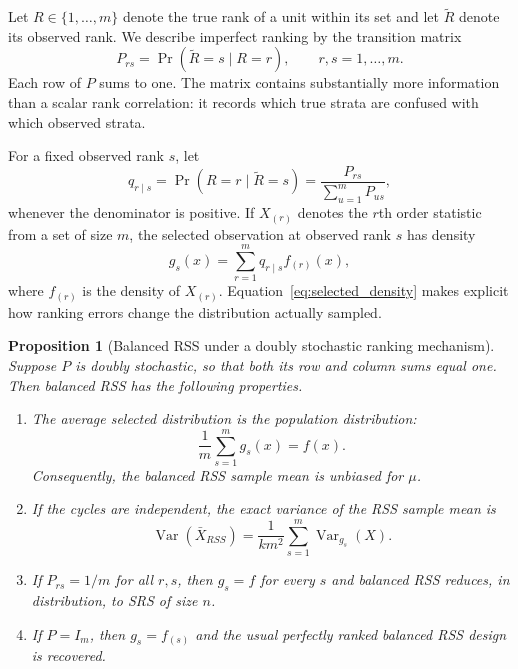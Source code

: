 \documentclass[12pt]{article}
\newtheorem{proposition}{Proposition}[section]
\begin{document}
Let $R\in\{1,\ldots,m\}$ denote the true rank of a unit within its set and let $\widetilde R$ denote its observed rank. We describe imperfect ranking by the transition matrix
\begin{equation}
\label{eq:transition_matrix}
P_{rs}=\Pr(\widetilde R=s\mid R=r), \qquad r,s=1,\ldots,m.
\end{equation}
Each row of $P$ sums to one. The matrix contains substantially more information than a scalar rank correlation: it records which true strata are confused with which observed strata.

For a fixed observed rank $s$, let
\begin{equation}
q_{r\mid s}=\Pr(R=r\mid \widetilde R=s)
=\frac{P_{rs}}{\sum_{u=1}^m P_{us}},
\label{eq:posterior_rank_weights}
\end{equation}
whenever the denominator is positive. If $X_{(r)}$ denotes the $r$th order statistic from a set of size $m$, the selected observation at observed rank $s$ has density
\begin{equation}
\label{eq:selected_density}
 g_s(x)=\sum_{r=1}^m q_{r\mid s} f_{(r)}(x),
\end{equation}
where $f_{(r)}$ is the density of $X_{(r)}$. Equation~\eqref{eq:selected_density} makes explicit how ranking errors change the distribution actually sampled.

\begin{proposition}[Balanced RSS under a doubly stochastic ranking mechanism]
\label{prop:doubly_stochastic}
Suppose $P$ is doubly stochastic, so that both its row and column sums equal one. Then balanced RSS has the following properties.
\begin{enumerate}
    \item The average selected distribution is the population distribution:
    \[
    \frac{1}{m}\sum_{s=1}^m g_s(x)=f(x).
    \]
    Consequently, the balanced RSS sample mean is unbiased for $\mu$.
    \item If the cycles are independent, the exact variance of the RSS sample mean is
    \begin{equation}
    \label{eq:rss_variance_transition}
    \operatorname{Var}(\bar X_{RSS})
    =\frac{1}{km^2}\sum_{s=1}^m \operatorname{Var}_{g_s}(X).
    \end{equation}
    \item If $P_{rs}=1/m$ for all $r,s$, then $g_s=f$ for every $s$ and balanced RSS reduces, in distribution, to SRS of size $n$.
    \item If $P=I_m$, then $g_s=f_{(s)}$ and the usual perfectly ranked balanced RSS design is recovered.
\end{enumerate}
\end{proposition}
\end{document}

